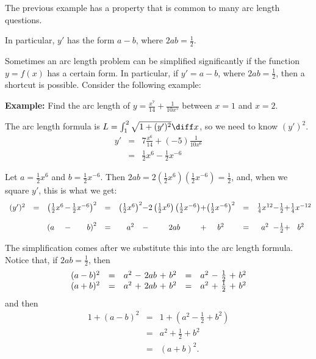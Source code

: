 \begin{frame}
The previous example has a property that is common to many arc length questions.

In particular, $y'$ has the form $a - b$, where $2ab = \frac{1}{2}$.
\end{frame}



Sometimes an arc length problem can be simplified significantly if the function $y = f(x)$ has a certain form.  In particular, if $y' = a - b$, where $2ab = \frac{1}{2}$, then a shortcut is possible.  Consider the following example:

\textbf{Example:}  Find the arc length of $\displaystyle y = \frac{x^7}{14} + \frac{1}{10x^5}$ between $x = 1$ and $x = 2$.

The arc length formula is $L = \int_1^2 \sqrt{1 + (y')^2}\diff x$, so we need to know $(y')^2$.
\begin{eqnarray*}
y' & = & 7\frac{x^6}{14} + (-5)\frac{1}{10x^6}\\
& = & \frac{1}{2} x^6 - \frac{1}{2}x^{-6}
\end{eqnarray*}

Let $a = \frac{1}{2}x^6$ and $b = \frac{1}{2}x^{-6}$.  Then $2ab = 2\left( \frac{1}{2}x^6\right) \left(\frac{1}{2}x^{-6}\right) = \frac{1}{2}$, and, when we square $y'$, this is what we get:
\[
\begin{array}{rcl@{}c@{}rcc@{}c@{}c@{}c@{}ccc@{}c@{}c@{}c@{}c@{}c}
(y')^2 & = & %
\left( \frac{1}{2}x^6 \right. & - & \left. \frac{1}{2}x^{-6}\right)^2 %
 & = & \left( \frac{1}{2}x^6 \right)^2 & - & 2  \left(\frac{1}{2}x^6\right)  \left(\frac{1}{2}x^{-6}\right) & + & \left( \frac{1}{2}x^{-6}\right)^2 %
 & = & \frac{1}{4}x^{12} & - & \frac{1}{2} & + & \frac{1}{4}x^{-12} \\%
 & & & & & & & & & & & & & & & & \\
 &  & %
\left( a \right. & - & \left. b \right)^2 %
 & = & a^2 & - & 2  a  b & + & b^2 %
 & = & a^{2} & - & \frac{1}{2} & + & b^{2} %
\end{array}
\]

The simplification comes after we substitute this into the arc length formula.  Notice that, if $2ab = \frac{1}{2}$, then
\[
\begin{array}{rcc@{\ }c@{\ }c@{\ }c@{\ }ccc@{\ }c@{\ }c@{\ }c@{\ }c}
(a-b)^2 & = & a^2 & - & 2ab & + & b^2 
 & = & a^2 & - & \frac{1}{2} & + & b^2 \\
(a+b)^2 & = & a^2 & + & 2ab & + & b^2 
 & = & a^2 & + & \frac{1}{2} & + & b^2 
\end{array}
\]
and then
\begin{eqnarray*}
1 + (a-b)^2 & = & 1 + \left( a^2 - \frac{1}{2} + b^2\right)\\
& = & a^2 + \frac{1}{2} + b^2 \\
& = & (a+b)^2.
\end{eqnarray*}

